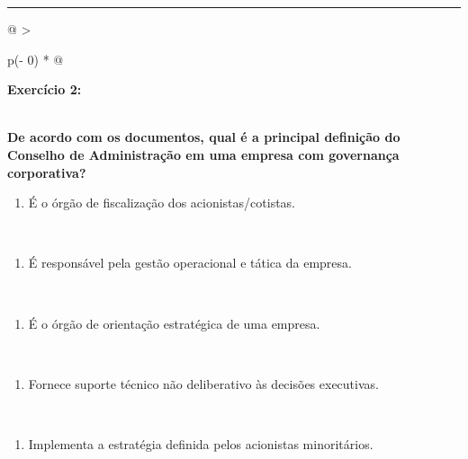 \documentclass[
]{book}
\providecommand{\tightlist}{%
  \setlength{\itemsep}{0pt}\setlength{\parskip}{0pt}}
\begin{document}
\begin{center}\rule{0.5\linewidth}{0.5pt}\end{center}

\begin{longtable}[]{@{}
  >{\raggedright\arraybackslash}p{(\columnwidth - 0\tabcolsep) * }@{}}
\toprule\noalign{}
\begin{minipage}[b]{\linewidth}\raggedright
\textbf{Exercício 2:}
\end{minipage} \\
\midrule\noalign{}
\endhead
\bottomrule\noalign{}
\endlastfoot
\textbf{De acordo com os documentos, qual é a principal definição do Conselho de Administração em uma empresa com governança corporativa?} \\
\begin{minipage}[t]{\linewidth}\raggedright
\begin{enumerate}
\def\labelenumi{\alph{enumi})}
\tightlist
\item
  É o órgão de fiscalização dos acionistas/cotistas.
\end{enumerate}
\end{minipage} \\
\begin{minipage}[t]{\linewidth}\raggedright
\begin{enumerate}
\def\labelenumi{\alph{enumi})}
\setcounter{enumi}{1}
\tightlist
\item
  É responsável pela gestão operacional e tática da empresa.
\end{enumerate}
\end{minipage} \\
\begin{minipage}[t]{\linewidth}\raggedright
\begin{enumerate}
\def\labelenumi{\alph{enumi})}
\setcounter{enumi}{2}
\tightlist
\item
  É o órgão de orientação estratégica de uma empresa.
\end{enumerate}
\end{minipage} \\
\begin{minipage}[t]{\linewidth}\raggedright
\begin{enumerate}
\def\labelenumi{\alph{enumi})}
\setcounter{enumi}{3}
\tightlist
\item
  Fornece suporte técnico não deliberativo às decisões executivas.
\end{enumerate}
\end{minipage} \\
\begin{minipage}[t]{\linewidth}\raggedright
\begin{enumerate}
\def\labelenumi{\alph{enumi})}
\setcounter{enumi}{4}
\tightlist
\item
  Implementa a estratégia definida pelos acionistas minoritários.
\end{enumerate}
\end{minipage} \\
\end{longtable}
\end{document}

